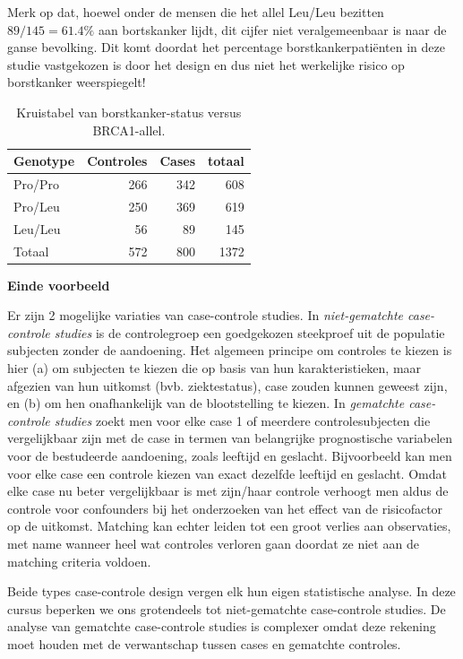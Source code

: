 \documentclass[
  12pt,dutch,coursenotes]{book}
\theoremstyle{definition}
\theoremstyle{definition}
\theoremstyle{definition}
\theoremstyle{definition}
\theoremstyle{remark}
\begin{document}
Merk op dat, hoewel onder de mensen die het allel Leu/Leu bezitten \(89/145=61.4\%\) aan bortskanker lijdt, dit cijfer niet
veralgemeenbaar is naar de ganse bevolking. Dit komt doordat het percentage
borstkankerpatiënten in deze studie vastgekozen is door het design en dus
niet het werkelijke risico op borstkanker weerspiegelt!

\begin{table}

\caption{\label{tab:leu}Kruistabel van borstkanker-status versus BRCA1-allel.}
\centering
\begin{tabular}[t]{lrrr}
\toprule
Genotype & Controles & Cases & totaal\\
\midrule
Pro/Pro & 266 & 342 & 608\\
Pro/Leu & 250 & 369 & 619\\
Leu/Leu & 56 & 89 & 145\\
Totaal & 572 & 800 & 1372\\
\bottomrule
\end{tabular}
\end{table}

\textbf{Einde voorbeeld}

Er zijn 2 mogelijke variaties van case-controle studies. In \emph{niet-gematchte case-controle studies} is de controlegroep een goedgekozen
steekproef uit de populatie subjecten zonder de
aandoening. Het algemeen principe om controles te kiezen is hier (a) om
subjecten te kiezen die op basis van hun karakteristieken,
maar afgezien van hun uitkomst (bvb. ziektestatus), case zouden kunnen
geweest zijn, en (b) om hen onafhankelijk van de blootstelling te kiezen. In
\emph{gematchte case-controle studies} zoekt men voor elke case 1 of
meerdere controlesubjecten die vergelijkbaar zijn met de case in termen van
belangrijke prognostische variabelen voor de bestudeerde aandoening, zoals
leeftijd en geslacht. Bijvoorbeeld kan men voor elke case een controle
kiezen van exact dezelfde leeftijd en geslacht. Omdat elke case nu beter
vergelijkbaar is met zijn/haar controle verhoogt men aldus de controle voor
confounders bij het onderzoeken van het effect van de risicofactor op de
uitkomst. Matching kan echter leiden tot een groot verlies aan observaties,
met name wanneer heel wat controles verloren gaan doordat ze niet aan de
matching criteria voldoen.

Beide types case-controle design vergen elk hun eigen statistische analyse.
In deze cursus beperken we ons grotendeels tot niet-gematchte case-controle studies. De
analyse van gematchte case-controle studies is complexer omdat deze rekening
moet houden met de verwantschap tussen cases en gematchte controles.
\end{document}
